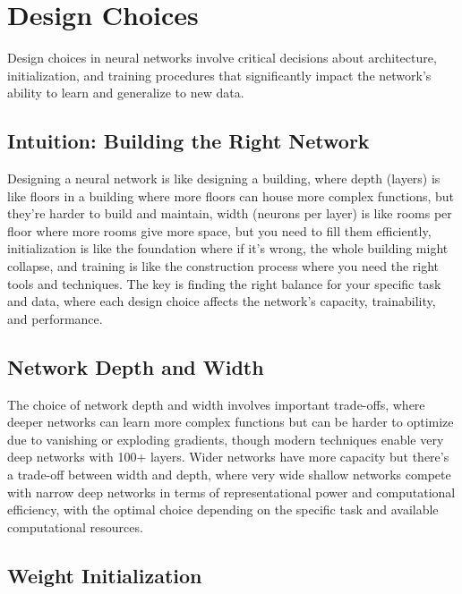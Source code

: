 
\section{Design Choices }
\label{sec:design-choices}

Design choices in neural networks involve critical decisions about architecture, initialization, and training procedures that significantly impact the network's ability to learn and generalize to new data.

\subsection{Intuition: Building the Right Network}

Designing a neural network is like designing a building, where depth (layers) is like floors in a building where more floors can house more complex functions, but they're harder to build and maintain, width (neurons per layer) is like rooms per floor where more rooms give more space, but you need to fill them efficiently, initialization is like the foundation where if it's wrong, the whole building might collapse, and training is like the construction process where you need the right tools and techniques. The key is finding the right balance for your specific task and data, where each design choice affects the network's capacity, trainability, and performance.

\subsection{Network Depth and Width}

The choice of network depth and width involves important trade-offs, where deeper networks can learn more complex functions but can be harder to optimize due to vanishing or exploding gradients, though modern techniques enable very deep networks with 100+ layers. Wider networks have more capacity but there's a trade-off between width and depth, where very wide shallow networks compete with narrow deep networks in terms of representational power and computational efficiency, with the optimal choice depending on the specific task and available computational resources.

\subsection{Weight Initialization}

